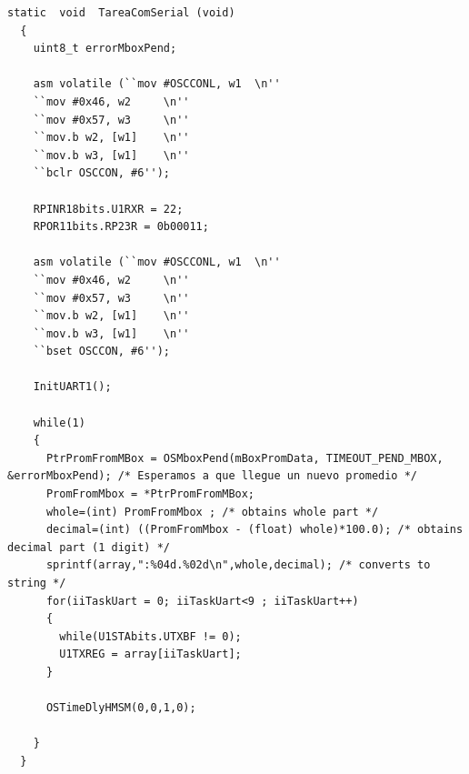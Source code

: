 \documentclass[11pt,a4paper,oneside]{article}
\begin{document}
\begin{lstlisting}[caption={Función de la tarea \emph{TareaComSerial()}},label=code:func-tareacom]
  static  void  TareaComSerial (void)
  {
    uint8_t errorMboxPend;
    
    asm volatile (``mov #OSCCONL, w1  \n''
    ``mov #0x46, w2     \n''
    ``mov #0x57, w3     \n''
    ``mov.b w2, [w1]    \n''
    ``mov.b w3, [w1]    \n''
    ``bclr OSCCON, #6'');
    
    RPINR18bits.U1RXR = 22;
    RPOR11bits.RP23R = 0b00011;
    
    asm volatile (``mov #OSCCONL, w1  \n''
    ``mov #0x46, w2     \n''
    ``mov #0x57, w3     \n''
    ``mov.b w2, [w1]    \n''
    ``mov.b w3, [w1]    \n''
    ``bset OSCCON, #6'');
    
    InitUART1();
    
    while(1)
    {
      PtrPromFromMBox = OSMboxPend(mBoxPromData, TIMEOUT_PEND_MBOX, &errorMboxPend); /* Esperamos a que llegue un nuevo promedio */
      PromFromMbox = *PtrPromFromMBox;
      whole=(int) PromFromMbox ; /* obtains whole part */
      decimal=(int) ((PromFromMbox - (float) whole)*100.0); /* obtains decimal part (1 digit) */
      sprintf(array,":%04d.%02d\n",whole,decimal); /* converts to string */
      for(iiTaskUart = 0; iiTaskUart<9 ; iiTaskUart++)
      {
        while(U1STAbits.UTXBF != 0);
        U1TXREG = array[iiTaskUart];
      }
      
      OSTimeDlyHMSM(0,0,1,0);
      
    }
  }
\end{lstlisting}



\end{document}
